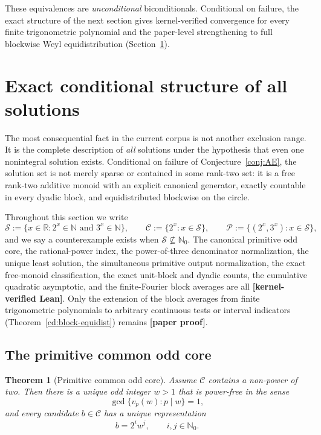 \documentclass[11pt,oneside]{article}
\newtheorem{theorem}{Theorem}[section]
\theoremstyle{definition}
\theoremstyle{remark}
\newcommand{\N}{\mathbb N}
\newcommand{\Nzero}{\mathbb N_0}
\newcommand{\R}{\mathbb R}
\newcommand{\Sol}{\mathcal S}
\newcommand{\Cand}{\mathcal C}
\newcommand{\Pair}{\mathcal P}
\newcommand{\vpp}[2]{v_{#1}\!\left(#2\right)}
\newcommand{\statuslean}{\textcolor{leanblue}{\textbf{[kernel-verified Lean]}}}
\newcommand{\statusnew}{\textcolor{newgreen}{\textbf{[paper proof]}}}
\begin{document}
These equivalences are \emph{unconditional} biconditionals.  Conditional on failure, the
exact structure of the next section gives kernel-verified convergence for every finite
trigonometric polynomial and the paper-level strengthening to full blockwise Weyl
equidistribution (Section~\ref{sec:conditional}).
\section{Exact conditional structure of all solutions}
\label{sec:conditional}

The most consequential fact in the current corpus is not another exclusion range.  It is the
complete description of \emph{all} solutions under the hypothesis that even one nonintegral
solution exists.  Conditional on failure of Conjecture~\ref{conj:AE}, the solution set is not
merely sparse or contained in some rank-two set: it is a free rank-two additive monoid with an
explicit canonical generator, exactly countable in every dyadic block, and equidistributed
blockwise on the circle.

Throughout this section we write
\[
 \Sol:=\{x\in\R:2^x\in\N\text{ and }3^x\in\N\},\qquad
 \Cand:=\{2^x:x\in\Sol\},\qquad
 \Pair:=\{(2^x,3^x):x\in\Sol\},
\]
and we say a counterexample exists when $\Sol\not\subseteq\Nzero$.  The canonical primitive odd
core, the rational-power index, the power-of-three denominator normalization, the unique least
solution, the simultaneous primitive output normalization, the exact free-monoid
classification, the exact unit-block and dyadic counts, the cumulative quadratic asymptotic,
and the finite-Fourier block averages are all \statuslean{}.  Only the extension of the block
averages from finite trigonometric polynomials to arbitrary continuous tests or interval
indicators (Theorem~\ref{cd:block-equidist}) remains \statusnew{}.

\subsection{The primitive common odd core}

\begin{theorem}[Primitive common odd core]
\label{cd:odd-core}
Assume $\Cand$ contains a non-power of two.  Then there is a unique odd integer $w>1$ that is
power-free in the sense
\[
\gcd\{\vpp{p}{w}:p\mid w\}=1,
\]
and every candidate $b\in\Cand$ has a unique representation
\[
b=2^iw^j,\qquad i,j\in\Nzero.
\]
\end{theorem}
\end{document}
